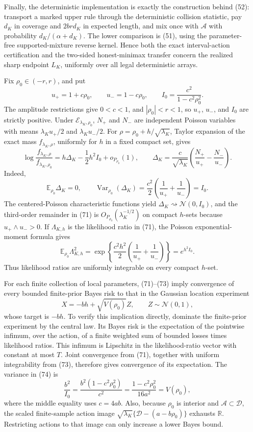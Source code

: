 Finally, the deterministic implementation is exactly the construction
behind (52): transport a marked upper rule through the deterministic
collision statistic, pay \(d_K\) in coverage and \(2brd_K\) in expected
length, and mix once with \(\mathcal A\) with probability
\(d_K/(\alpha+d_K)\).  The lower comparison is (51), using the
parameter-free supported-mixture reverse kernel.  Hence both the exact
interval-action certification and the two-sided honest-minimax transfer
concern the realized sharp endpoint \(L_K\), uniformly over all legal
deterministic arrays.

Fix \(\rho_0\in(-r,r)\), and put
\[
 u_+=1+c\rho_0,\qquad
 u_-=1-c\rho_0,\qquad
 I_0=\frac{c^2}{1-c^2\rho_0^2}.
 \tag{70}
\]
The amplitude restrictions give \(0<c<1\), and
\(|\rho_0|<r<1\), so \(u_+\), \(u_-\), and \(I_0\) are strictly
positive.  Under \(\mathcal E_{\lambda_K,\rho_0}\), \(N_+\) and \(N_-\)
are independent Poisson variables with means
\(\lambda_Ku_+/2\) and \(\lambda_Ku_-/2\).  For
\(\rho=\rho_0+h/\sqrt{\lambda_K}\), Taylor expansion of the exact mass
\(f_{\lambda_K,\rho}\), uniformly for \(h\) in a fixed compact set,
gives
\[
 \log\frac{f_{\lambda_K,\rho}}
 {f_{\lambda_K,\rho_0}}
 =
 h\Delta_K-\frac12h^2I_0+o_{P_{\rho_0}}(1),
 \qquad
 \Delta_K=
 \frac c{\sqrt{\lambda_K}}
 \left(\frac{N_+}{u_+}-\frac{N_-}{u_-}\right).
 \tag{71}
\]
Indeed,
\[
 \mathbb E_{\rho_0}\Delta_K=0,
 \qquad
 \operatorname{Var}_{\rho_0}(\Delta_K)
 =
 \frac{c^2}{2}\left(\frac1{u_+}+\frac1{u_-}\right)
 =I_0.
 \tag{72}
\]
The centered-Poisson characteristic functions yield
\(\Delta_K\rightsquigarrow\mathcal N(0,I_0)\), and the third-order
remainder in (71) is \(O_{P_{\rho_0}}(\lambda_K^{-1/2})\) on compact
\(h\)-sets because \(u_+\wedge u_->0\).  If \(\Lambda_{K,h}\) is the
likelihood ratio in (71), the Poisson exponential-moment formula gives
\[
 \mathbb E_{\rho_0}\Lambda_{K,h}^2
 =
 \exp\left\{
 \frac{c^2h^2}{2}
 \left(\frac1{u_+}+\frac1{u_-}\right)\right\}
 =e^{h^2I_0}.
 \tag{73}
\]
Thus likelihood ratios are uniformly integrable on every compact
\(h\)-set.

For each finite collection of local parameters, (71)--(73) imply
convergence of every bounded finite-prior Bayes risk to that in the
Gaussian location experiment
\[
 X=-bh+\sqrt{V(\rho_0)}Z,
 \qquad Z\sim\mathcal N(0,1),
 \tag{74}
\]
whose target is \(-bh\).  To verify this implication directly, dominate
the finite-prior experiment by the central law.  Its Bayes risk is the
expectation of the pointwise infimum, over the action, of a finite
weighted sum of bounded losses times likelihood ratios.  This infimum
is Lipschitz in the likelihood-ratio vector with constant at most \(T\).
Joint convergence from (71), together with uniform integrability from
(73), therefore gives convergence of its expectation.  The variance in
(74) is
\[
 \frac{b^2}{I_0}
 =
 \frac{b^2(1-c^2\rho_0^2)}{c^2}
 =
 \frac{1-c^2\rho_0^2}{16a^2}
 =V(\rho_0),
 \tag{75}
\]
where the middle equality uses \(c=4ab\).  Also, because \(\rho_0\) is
interior and \(\mathcal A\subset\mathcal D\), the scaled finite-sample
action image
\(\sqrt{\lambda_K}\{\mathcal D-(a-b\rho_0)\}\) exhausts
\(\mathbb R\).  Restricting actions to that image can only increase a
lower Bayes bound.

